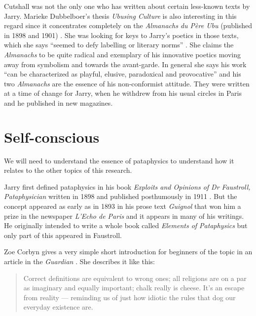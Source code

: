 
Cutshall was not the only one who has written about certain less-known texts by Jarry. Marieke Dubbelboer's thesis \textit{Ubusing Culture} is also interesting in this regard since it concentrates completely on the \textit{Almanachs du Père Ubu} (published in 1898 and 1901) \autocite*{Dubbelboer2009}. She was looking for keys to Jarry's poetics in those texts, which she says ``seemed to defy labelling or literary norms'' \autocite*{Dubbelboer2009}. She claims the \textit{Almanachs} to be quite radical and exemplary of his innovative poetics moving away from symbolism and towards the avant-garde. In general she says his work ``can be characterized as playful, elusive, paradoxical and provocative'' \autocite*{Dubbelboer2009} and his two \textit{Almanachs} are the essence of his non-conformist attitude. They were written at a time of change for Jarry, when he withdrew from his usual circles in Paris and he published in new magazines.


\section{Self-conscious}

We will need to understand the essence of pataphysics to understand how it relates to the other topics of this research.

Jarry first defined pataphysics in his book \textit{Exploits and Opinions of Dr Faustroll, Pataphysician} written in 1898 and published posthumously in 1911 \autocite*{Jarry1996}. But the concept appeared as early as in 1893 in his prose text \textit{Guignol} that won him a prize in the newspaper \textit{L'Echo de Paris} and it appears in many of his writings. He originally intended to write a whole book called \textit{Elements of Pataphysics} but only part of this appeared in Faustroll.

Zoe Corbyn gives a very simple short introduction for beginners of the topic in an article in the \textit{Guardian} \autocite*{Corbyn2005}. She describes it like this:

\begin{quotation}
  Correct definitions are equivalent to wrong ones; all religions are on a par as imaginary and equally important; chalk really is cheese. It's an escape from reality --- reminding us of just how idiotic the rules that dog our everyday existence are. 
\end{quotation}


